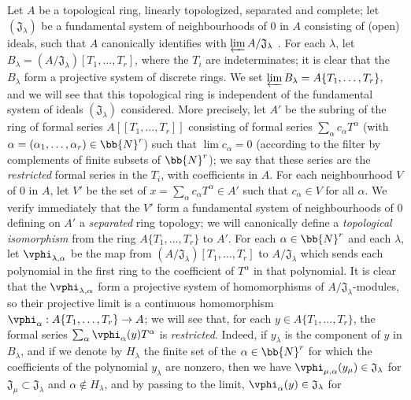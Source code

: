 \begin{env}[7.5.1]
\label{0.7.5.1}
Let $A$ be a topological ring, linearly topologized, separated and complete; let
$(\mathfrak{J}_\lambda)$ be a fundamental system of neighbourhoods of $0$ in $A$
consisting of (open) ideals, such that $A$ canonically identifies with
$\varprojlim A/\mathfrak{J}_\lambda$ . For each
$\lambda$, let $B_\lambda=(A/\mathfrak{J}_\lambda)[T_1,\dots,T_r]$, where the
$T_i$ are indeterminates; it is clear that the $B_\lambda$ form a projective system
of discrete rings. We set $\varprojlim B_\lambda=A\{T_1,\dots,T_r\}$, and we will
see that this topological ring is independent of the fundamental system of ideals
$(\mathfrak{J}_\lambda)$ considered. More precisely, let $A'$ be the subring of the
ring of formal series $A[\![T_1,\dots,T_r]\!]$ consisting of formal series
$\sum_\alpha c_\alpha T^\alpha$ (with $\alpha=(\alpha_1,\dots,\alpha_r)\in\bb{N}^r$)
such that $\lim c_\alpha=0$ (according to the filter by complements of finite subsets
of $\bb{N}^r$); we say that these series are the \emph{restricted} formal series in the
$T_i$, with coefficients in $A$.
For each neighbourhood $V$ of $0$ in $A$, let $V'$ be the set of
$x=\sum_\alpha c_\alpha T^\alpha\in A'$ such that $c_\alpha\in V$ for all $\alpha$.
We verify immediately that the $V'$ form a fundamental system of neighbourhoods of $0$
defining on $A'$ a \emph{separated} ring topology; we will canonically define a
\emph{topological isomorphism} from the ring $A\{T_1,\dots,T_r\}$ to $A'$. For each
$\alpha\in\bb{N}^r$ and each $\lambda$, let $\vphi_{\lambda,\alpha}$ be the map from
$(A/\mathfrak{J}_\lambda)[T_1,\dots,T_r]$ to $A/\mathfrak{J}_\lambda$ which sends each
polynomial in the first ring to the coefficient of $T^\alpha$ in that polynomial. It is
clear that the $\vphi_{\lambda,\alpha}$ form a projective system of homomorphisms of
$A/\mathfrak{J}_\lambda$-modules, so their projective limit is a continuous
homomorphism $\vphi_\alpha:A\{T_1,\dots,T_r\}\to A$; we will see that, for each
$y\in A\{T_1,\dots,T_r\}$, the formal series $\sum_\alpha\vphi_\alpha(y)T^\alpha$ is
\emph{restricted}. Indeed, if $y_\lambda$ is the component of $y$ in $B_\lambda$, and
if we denote by $H_\lambda$ the finite set of the $\alpha\in\bb{N}^r$ for which the
coefficients of the polynomial $y_\lambda$ are nonzero, then we have
$\vphi_{\mu,\alpha}(y_\mu)\in\mathfrak{J}_\lambda$ for
$\mathfrak{J}_\mu\subset\mathfrak{J}_\lambda$ and $\alpha\not\in H_\lambda$, and by
passing to the limit, $\vphi_\alpha(y)\in\mathfrak{J}_\lambda$ for

\end{env}

